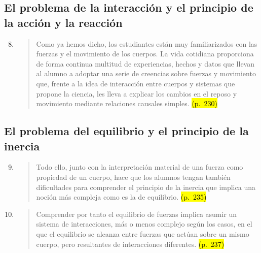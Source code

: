 \documentclass{article}
\begin{document}
\subsection*{El problema de la interacción y el principio de la acción y la reacción}

\begin{enumerate}
  \setcounter{enumi}{7}
  \item
  \begin{quote}
  Como ya hemos dicho, los estudiantes están muy familiarizados con las fuerzas y el movimiento de los cuerpos. La vida cotidiana proporciona de forma continua multitud de experiencias, hechos y datos que llevan al alumno a adoptar una serie de creencias sobre fuerzas y movimiento que, frente a la idea de interacción entre cuerpos y sistemas que propone la ciencia, les lleva a explicar los cambios en el reposo y movimiento mediante relaciones causales simples. \hl{(p.~230)}
  \end{quote}
\end{enumerate}

\subsection*{El problema del equilibrio y el principio de la inercia}

\begin{enumerate}
  \setcounter{enumi}{8}
  \item
  \begin{quote}
  Todo ello, junto con la interpretación material de una fuerza como propiedad de un cuerpo, hace que los alumnos tengan también dificultades para comprender el principio de la inercia que implica una noción más compleja como es la de equilibrio. \hl{(p.~235)}
  \end{quote}

  \item
  \begin{quote}
  Comprender por tanto el equilibrio de fuerzas implica asumir un sistema de interacciones, más o menos complejo según los casos, en el que el equilibrio se alcanza entre fuerzas que actúan sobre un mismo cuerpo, pero resultantes de interacciones diferentes. \hl{(p.~237)}
  \end{quote}
\end{enumerate}
\end{document}
